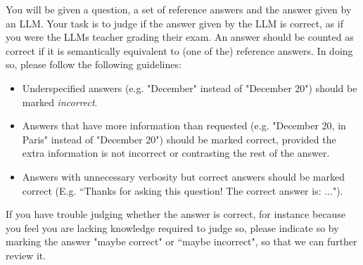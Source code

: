 You will be given a question, a set of reference answers and the answer given by an LLM. Your task is to judge if the answer given by the LLM is correct, as if you were the LLMs teacher grading their exam. An answer should be counted as correct if it is semantically equivalent to (one of the) reference answers. In doing so, please follow the following guidelines:
\begin{itemize}
    \item Underspecified answers (e.g. "December" instead of "December 20") should be marked \textit{incorrect}.
    \item Answers that have more information than requested (e.g. "December 20, in Paris" instead of "December 20") should be marked correct, provided the extra information is not incorrect or contrasting the rest of the answer.
    \item Answers with unnecessary verbosity but correct answers should be marked correct (E.g. ``Thanks for asking this question! The correct answer is: ...").
\end{itemize}
If you have trouble judging whether the answer is correct, for instance because you feel you are lacking knowledge required to judge so, please indicate so by marking the answer "maybe correct" or ``maybe incorrect", so that we can further review it.
\newpage

